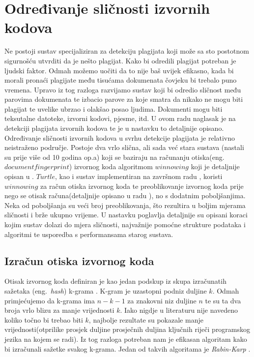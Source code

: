 \chapter{Određivanje sličnosti izvornih kodova}

Ne postoji sustav specijaliziran za detekciju plagijata koji može sa sto postotnom sigurnošću utvrditi da je nešto plagijat. Kako bi odredili plagijat potreban je ljudski faktor.  Odmah možemo uočiti da to nije baš uvijek efikasno, kada bi morali pronaći plagijate među tisućama dokumenata čovjeku bi trebalo puno vremena. Upravo iz tog razloga razvijamo sustav koji bi odredio sličnost među parovima dokumenata te izbacio parove za koje smatra da nikako ne mogu biti plagijat te uvelike ubrzao i olakšao posao ljudima. Dokumenti mogu biti teksutalne datoteke, izvorni kodovi, pjesme, itd. U ovom radu naglasak je na detekciji plagijata izvornih kodova te je u nastavku to detaljnije opisano. \\
	
	Određivanje sličnosti izvornih kodova u svrhu detekcije plagijata je relativno neistraženo područje. Postoje dva vrlo slična, ali sada već stara sustava (nastali su prije više od 10 godina op.a)  \cite{moss} \cite{jplag} koji se baziraju na računanju otiska(eng.~$document fingerprint$) izvornog koda algoritmom $winnowing$ koji je detaljnije opisan u \cite{winnowing}. $Turtle$, kao i sustav implementiran na završnom radu \cite{plagijator}, koristi $winnowing$ za račun otiska izvornog koda te preoblikovanje izvornog koda prije nego se otisak računa(detaljnije opisano u radu \cite{dorian}), no s dodatnim poboljšanjima. Neka od poboljšanja su veći broj preoblikovanja, što rezultira u boljim mjerama sličnosti i brže ukupno vrijeme. U nastavku poglavlja detaljnije su opisani koraci kojim sustav dolazi do mjera sličnosti, najvažnije pomoćne strukture podataka i algoritmi te usporedba s performansama starog sustava.

\section{Izračun otiska izvornog koda}

Otisak izvornog koda definiran je kao jedan podskup iz skupa izračunatih sažetaka (eng.~\textit{hash}) k-grama \cite{winnowing}. K-gram je uzastopni podniz duljine $k$. Odmah primjećujemo da k-grama ima $n-k-1$ za znakovni niz duljine $n$ te su ta dva broja vrlo blizu za manje vrijednosti $k$. Iako nigdje u literaturu nije navedeno koliko točno bi trebao biti $k$, najbolje rezultate su pokazale manje vrijednosti(otprilike prosjek duljine prosječnih duljina ključnih riječi programskog jezika na kojem se radi).  Iz tog razloga potreban nam je efikasan algoritam kako bi izračunali sažetke svakog k-grama. Jedan od takvih algoritama je \textit{Rabin-Karp} \cite{rabin-karp}.

